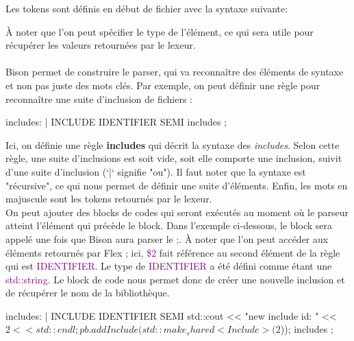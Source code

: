 \documentclass[a4paper]{article}%
\begin{document}
Les tokens sont définis en début de fichier avec la syntaxe suivante:

\begin{code}
\end{code}\leavevmode\newline

À noter que l'on peut spécifier le type de l'élément, ce qui sera utile pour
récupérer les valeurs retournées par le lexeur.\\~\\


Bison permet de construire le parser, qui va reconnaître des éléments de syntaxe
et non pas juste des mots clés. Par exemple, on peut définir une règle pour
reconnaître une suite d'inclusion de fichiers :\\

\begin{code}[language=c++]
includes: %
       | INCLUDE IDENTIFIER SEMI includes
       ;
\end{code}\leavevmode\newline

Ici, on définie une règle \textbf{includes} qui décrit la syntaxe des \textit{includes}. Selon cette règle, une suite d'inclusions est soit vide, soit elle comporte une inclusion, suivit d'une suite d'inclusion (`|` signifie "ou"). Il faut noter que la syntaxe est "récursive", ce qui nous permet de définir une suite d'éléments.
Enfin, les mots en majuscule sont les tokens retournés par le lexeur.\\

On peut ajouter des blocks de codes qui seront exécutés au moment où le parseur
atteint l'élément qui précède le block. Dans l'exemple ci-dessous, le block sera appelé une fois que Bison aura parser le \textcolor{purple}{;}. À noter que l'on peut accéder aux éléments retournés par Flex ; ici, \textcolor{purple}{\$2} fait référence au second élément de la règle qui est \textcolor{purple}{IDENTIFIER}. Le type de \textcolor{purple}{IDENTIFIER} a été défini comme étant une \textcolor{purple}{std::string}. Le block de code nous permet donc de créer une nouvelle inclusion et de récupérer le nom de la bibliothèque.\\

\begin{code}[language=c++]
includes: %
       |
       INCLUDE IDENTIFIER SEMI
       {
         std::cout << "new include id: " << $2 << std::endl;
         pb.addInclude(std::make_shared<Include>($2));
       }
       includes
       ;
\end{code}\leavevmode\newline
\end{document}
